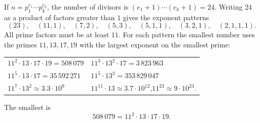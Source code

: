 If $n=p_1^{e_1}\cdots p_k^{e_k}$, the number of divisors is $(e_1+1)\cdots(e_k+1)=24$. Writing $24$ as a product of factors greater than $1$ gives the exponent patterns
\[(23),\quad(11,1),\quad(7,2),\quad(5,3),\quad(5,1,1),\quad(3,2,1),\quad(2,1,1,1).\]
All prime factors must be at least $11$. For each pattern the smallest number uses the primes $11,13,17,19$ with the largest exponent on the smallest prime:
\begin{center}
\begin{tabular}{ll}
$11^2\cdot13\cdot17\cdot19=508\,079$ & $11^3\cdot13^2\cdot17=3\,823\,963$\\
$11^5\cdot13\cdot17=35\,592\,271$ & $11^5\cdot13^3=353\,829\,047$\\
$11^7\cdot13^2\approx3.3\cdot10^{9}$ & $11^{11}\cdot13\approx3.7\cdot10^{12}$,\quad $11^{23}\approx9\cdot10^{23}$.
\end{tabular}
\end{center}
The smallest is
\[\boxed{508\,079=11^2\cdot13\cdot17\cdot19}.\]
